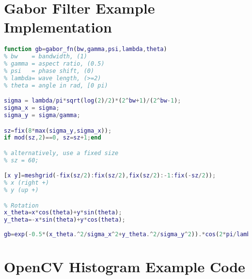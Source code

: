 \section{Gabor Filter Example Implementation}
\begin{lstlisting}[language=MATLAB,breaklines=true,
caption={Example implementation of a Gabor Filter in MATLAB\cite{Yang2010Gabor}}, frame=single]
function gb=gabor_fn(bw,gamma,psi,lambda,theta)
% bw    = bandwidth, (1)
% gamma = aspect ratio, (0.5)
% psi   = phase shift, (0)
% lambda= wave length, (>=2)
% theta = angle in rad, [0 pi)

sigma = lambda/pi*sqrt(log(2)/2)*(2^bw+1)/(2^bw-1);
sigma_x = sigma;
sigma_y = sigma/gamma;

sz=fix(8*max(sigma_y,sigma_x));
if mod(sz,2)==0, sz=sz+1;end

% alternatively, use a fixed size
% sz = 60;

[x y]=meshgrid(-fix(sz/2):fix(sz/2),fix(sz/2):-1:fix(-sz/2));
% x (right +)
% y (up +)

% Rotation 
x_theta=x*cos(theta)+y*sin(theta);
y_theta=-x*sin(theta)+y*cos(theta);
 
gb=exp(-0.5*(x_theta.^2/sigma_x^2+y_theta.^2/sigma_y^2)).*cos(2*pi/lambda*x_theta+psi);
\end{lstlisting}


\section{OpenCV Histogram Example Code}


